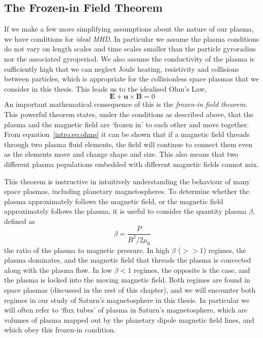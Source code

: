 \subsection{The Frozen-in Field Theorem}\label{intro:sec:frozenin}
If we make a few more simplifying assumptions about the nature of our plasma, we have conditions for \textit{ideal MHD}. In particular we assume the plasma conditions do not vary on length scales and time scales smaller than the particle gyroradius nor the associated gyroperiod. We also assume the conductivity of the plasma is sufficiently high that we can neglect Joule heating, resistivity and collisions between particles, which is appropriate for the collisionless space plasmas that we consider in this thesis. This leads us to the idealised Ohm's Law,
\begin{equation}\label{intro:eq:ohms}
\boldsymbol{E} + \boldsymbol{u} \times \boldsymbol{B} = 0
\end{equation}
An important mathematical consequence of this is the \textit{frozen-in field theorem}. This powerful theorem states, under the conditions as described above, that the plasma and the magnetic field are `frozen in' to each other and move together. From equation~\ref{intro:eq:ohms} it can be shown that if a magnetic field threads through two plasma fluid elements, the field will continue to connect them even as the elements move and change shape and size. This also means that two different plasma populations embedded with different magnetic fields cannot mix.

This theorem is instructive in intuitively understanding the behaviour of many space plasmas, including planetary magnetospheres. To determine whether the plasma approximately follows the magnetic field, or the magnetic field approximately follows the plasma, it is useful to consider the quantity plasma $\beta$, defined as
\begin{equation}
\beta = \frac{P}{B^2/2\mu_0}
\end{equation}
the ratio of the plasma to magnetic pressure. In high $\beta$ ($>>1$) regimes, the plasma dominates, and the magnetic field that threads the plasma is convected along with the plasma flow. In low $\beta<1$ regimes, the opposite is the case, and the plasma is locked into the moving magnetic field. Both regimes are found in space plasmas (discussed in the rest of this chapter), and we will encounter both regimes in our study of Saturn's magnetosphere in this thesis. In particular we will often refer to `flux tubes' of plasma in Saturn's magnetosphere, which are volumes of plasma mapped out by the planetary dipole magnetic field lines, and which obey this frozen-in condition.

